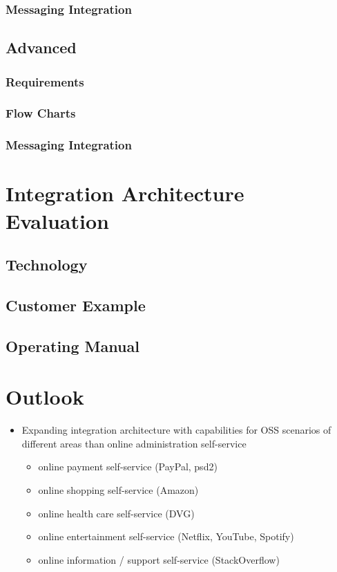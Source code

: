 \documentclass[
     12pt,         %
     a4paper,      %
     BCOR=10mm,version=first,     %
     DIV=14,version=first,        %
     ]{scrreprt}
\begin{document}
\subsection{Messaging Integration}

\section{Advanced}

\subsection{Requirements}

\subsection{Flow Charts}

\subsection{Messaging Integration}


\chapter{Integration Architecture Evaluation}

\section{Technology}

\section{Customer Example}

\section{Operating Manual}

\chapter{Outlook}

\begin{itemize}
     \item Expanding integration architecture with capabilities for OSS scenarios of different areas than online administration self-service
     \begin{itemize}
          \item online payment self-service (PayPal, psd2)
          \item online shopping self-service (Amazon)
          \item online health care self-service (DVG)
          \item online entertainment self-service (Netflix, YouTube, Spotify)
          \item online information / support self-service (StackOverflow)
     \end{itemize}
\end{itemize}

\printbibliography
\end{document}
